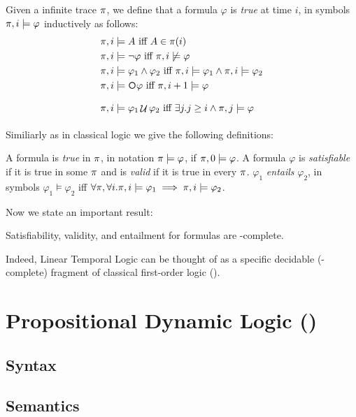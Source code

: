\begin{definition}\label{ltl-satisfaction}
	Given a infinite trace $\pi$, we define that a \LTL formula $\varphi$ is \emph{true} at time $i$, in symbols $\pi, i \models \varphi$ inductively as follows:
	\begin{align*}
		\trace, i &\models A \tiff A \in \trace(i)\\
		\trace, i &\models \lnot \varphi \tiff \trace, i \not\models \varphi\\
		\trace, i &\models \varphi_1 \AND \varphi_2 \tiff \trace, i \models \varphi_1 \AND \trace, i \models \varphi_2\\
		\trace, i &\models \Next\varphi \tiff \trace,i+1 \models \varphi\\
		\trace, i &\models \varphi_1 \Until \varphi_2 \tiff \exists j. j\ge i \AND \trace,j \models \varphi \\
	\end{align*}
\end{definition}
Similiarly as in classical logic we give the following definitions:
\begin{definition}
A \LTL formula is \emph{true} in $\pi$, in notation $\pi \models \varphi$, if $\pi, 0 \models \varphi$. A formula $\varphi$ is \emph{satisfiable} if it is true in some $\pi$ and is \emph{valid} if it is true in every $\pi$. $\varphi_1$ \emph{entails} $\varphi_2$, in symbols $\varphi_1 \models \varphi_2$ iff $\forall \pi, \forall i.\pi, i \models \varphi_1 \implies \pi, i \models \varphi_2$.
\end{definition}

Now we state an important result:
\begin{theorem}
	Satisfiability, validity, and entailment for \LTL formulas are \PSPACE-complete.
\end{theorem}
Indeed, Linear Temporal Logic can be thought of as a specific decidable (\PSPACE-complete) fragment of classical first-order logic (\FOL).
\section{Propositional Dynamic Logic (\PDL)}

\subsection{Syntax}
\subsection{Semantics}

